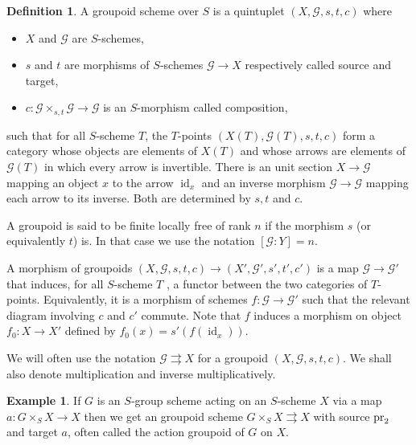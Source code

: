 \documentclass{amsart}
\theoremstyle{definition}
\newtheorem{defi}{Definition}[section]
\newtheorem{exam}{Example}[section]
\theoremstyle{remark}
\begin{document}
\begin{defi}

A groupoid scheme over $S$ is a quintuplet $(X,{{\mathcal G}},s,t,c)$ where 

\begin{itemize}

\item $X$ and ${{\mathcal G}}$ are $S$-schemes,

\item $s$ and $t$ are morphisms of $S$-schemes ${{\mathcal G}} {\longrightarrow} X$ respectively called source and target,

\item $c : {{\mathcal G}} \times_{s,t} {{\mathcal G}} {\longrightarrow} {{\mathcal G}}$ is an $S$-morphism called composition,

\end{itemize}

such that for all $S$-scheme $T$, the $T$-points $(X(T),{{\mathcal G}}(T),s,t,c)$ form a category whose objects are elements of $X(T)$ and whose arrows are elements of ${{\mathcal G}}(T)$ in which every arrow is invertible. 
There is an unit section $X {\longrightarrow} {{\mathcal G}}$ mapping an object $x$ to the arrow $\operatorname{id}_x$ and an inverse morphism ${{\mathcal G}} {\longrightarrow} {{\mathcal G}}$ mapping each arrow to its inverse. Both are determined by $s,t$ and $c$.

A groupoid is said to be finite locally free of rank $n$ if the morphism $s$ (or equivalently $t$) is. In that case we use the notation $[{{\mathcal G}} : Y] = n$. 

A morphism of groupoids $(X,{{\mathcal G}},s,t,c) {\longrightarrow} (X',{{\mathcal G}}',s',t',c')$ is a map ${{\mathcal G}} {\longrightarrow} {{\mathcal G}}'$ that induces, for all $S$-scheme $T$ , a functor between the two categories of $T$-points. Equivalently, it is a morphism of schemes $f : {{\mathcal G}} {\longrightarrow} {{\mathcal G}}'$ such that the relevant diagram involving $c$ and $c'$ commute.
Note that $f$ induces a morphism on object $f_0 : X {\longrightarrow} X'$ defined by $f_0(x) = s'(f(\operatorname{id}_x))$.

 We will often use the notation ${{\mathcal G}} {\rightrightarrows} X$ for a groupoid $(X,{{\mathcal G}},s,t,c)$. We shall also denote multiplication and inverse multiplicatively.
\end{defi}

\begin{exam}

If $G$ is an $S$-group scheme acting on an $S$-scheme $X$ via a map $a : G \times_S X {\longrightarrow} X$ then we get an groupoid scheme $G \times_S X {\rightrightarrows} X$ with source $\textup{pr}_2$ and target $a$, often called the action groupoid of $G $ on $X$.

\end{exam}
\end{document}
